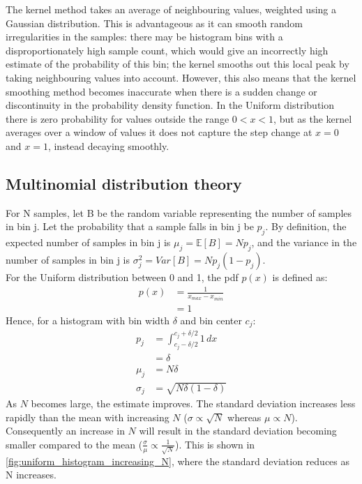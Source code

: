 \documentclass[a4paper]{article}
\begin{document}
The kernel method takes an average of neighbouring values, weighted using a Gaussian distribution. This is advantageous
as it can smooth random irregularities in the samples: there may be histogram bins with a disproportionately high sample
count, which would give an incorrectly high estimate of the probability of this bin; the kernel smooths out this local
peak by taking neighbouring values into account. However, this also means that the kernel smoothing method becomes
inaccurate when there is a sudden change or discontinuity in the probability density function. In the Uniform
distribution there is zero probability for values outside the range $0<x<1$, but as the kernel averages over a window of
values it does not capture the step change at $x=0$ and $x=1$, instead decaying smoothly.


\subsection{Multinomial distribution theory}

For N samples, let B be the random variable representing the number of samples in bin j. Let the probability that a
sample falls in bin j be $p_j$. By definition, the expected number of samples in bin j is $\mu_j = \mathbb{E}[B] = N p_j$,
and the variance in the number of samples in bin j is $\sigma^2_j = Var[B] = N p_j (1 - p_j)$.
\\
For the Uniform distribution between 0 and 1, the pdf $p(x)$ is defined as:
\begin{align*}
    p(x) &= \frac{1}{x_{max} - x_{min}} \\
         &= 1
\end{align*}
Hence, for a histogram with bin width $\delta$ and bin center $c_j$:
\begin{align*}
    p_j &= \int_{c_j - \delta/2}^{c_j + \delta/2}1\,dx \\
        &= \delta \\
    \mu_j &= N \delta \\
    \sigma_j &= \sqrt{N \delta (1 - \delta)}
\end{align*}
As $N$ becomes large, the estimate improves. The standard deviation increases less rapidly than the mean with increasing
$N$ ($\sigma \propto \sqrt{N}$ whereas $\mu \propto N$). Consequently an increase in $N$ will result in the standard
deviation becoming smaller compared to the mean ($\frac{\sigma}{\mu} \propto \frac{1}{\sqrt{N}}$). This is shown in
\autoref{fig:uniform_histogram_increasing_N}, where the standard deviation reduces as N increases.
\end{document}
